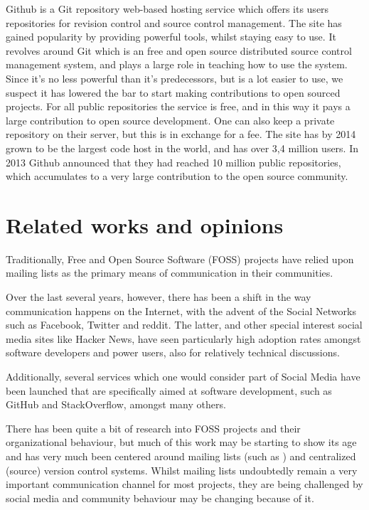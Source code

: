 \documentclass[a4paper,11pt]{article} %
\begin{document}
Github is a Git repository web-based hosting service which offers its users
repositories for revision control and source control management. The site
has gained popularity by providing powerful tools, whilst staying easy to
use. It revolves around Git which is an free and open source distributed
source control management system, and plays a large role in teaching how to
use the system. Since it’s no less powerful than it’s predecessors, but is a
lot easier to use, we suspect it has lowered the bar to start making
contributions to open sourced projects. For all public repositories the
service is free, and in this way it pays a large contribution to open source
development. One can also keep a private repository on their server, but
this is in exchange for a fee. The site has by 2014 grown to be the largest
code host in the world, and has over 3,4 million users. In 2013 Github
announced that they had reached 10 million public repositories, which
accumulates to a very large contribution to the open source community.

\section{Related works and opinions}

Traditionally, Free and Open Source Software (FOSS) projects have
relied upon mailing lists as the primary means of communication in
their communities. %

Over the last several years, however, there has been a shift in the
way communication happens on the Internet, with the advent of the
Social Networks such as Facebook, Twitter and reddit. The latter, and
other special interest social media sites like Hacker News, have seen
particularly high adoption rates amongst software developers and power
users, also for relatively technical discussions.

Additionally, several services which one would consider part of Social
Media have been launched that are specifically aimed at software
development, such as GitHub and StackOverflow, amongst many others.

There has been quite a bit of research into FOSS projects and their
organizational behaviour, but much of this work may be starting to
show its age and has very much been centered around mailing lists
(such as \cite{Oezbek10Cancer, singh2011network}) and centralized (source) version
control systems. Whilst mailing lists undoubtedly remain a very
important communication channel for most projects, they are being
challenged by social media and community behaviour may be changing
because of it.
\end{document}
